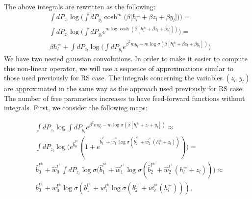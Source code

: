 The above integrals are rewritten as the following:
\begin{align}
& \int dP_{z_l} \log \bigg( \int dP_{y_{l}}  \cosh^m\bigg(\beta \big[h_l^{\pm}+\beta z_l + \beta  y_{l}\big]  \bigg)  \bigg) 
 = \\
& \int dP_{z_l} \log \biggl( \int dP_{y_{l}} e^{ m \log \cosh \left(\beta \left[h_l^{\pm}+ \beta  z_l + \beta  y_{l}\right]  \right) } \biggr) 
 = \\
& \beta h_{l}^{\pm} + \int dP_{z_l} \log \biggl( \int dP_{y_{l}} e^{\beta^2 m y_{l} - m \log \sigma \left(\beta \left[h_l^{\pm}+ \beta z_l +\beta y_{l}\right]  \right) } \biggr) 
\end{align}
We have two nested gaussian convolutions. In order to make it easier to compute this non-linear operator, we will use a sequence of approximations similar to those used previously for RS case. %
The integrals concerning the variables $(z_l, y_l)$ are approximated in the same way as the approach used previously for RS case: The number of free parameters increases to have feed-forward functions without integrals. First, we consider the following maps:
\begin{widetext}
\begin{align}
        & \int dP_{z_l}  \log \int dP_{y_{l}} e^{ \beta^2 m y_{l} - m \log \sigma \left(\beta \left[h_l^{\pm}+ z_l + y_{l}\right]  \right) }  \approx\\
        & \int dP_{z_l} \log \bigg( e^{\hat{b}_0^{l^{\pm}}}(1 + e^{\hat{b}_1^{l^{\pm}} + \hat{w}_1^{l^{\pm}} \log \sigma (\hat{b}_2^{l^{\pm}} + \hat{w}_2^{l^{\pm}} (h_l^{\pm}+ z_l)) }) \bigg) = \\
        & \hat{b}_0^{l^{\pm}} + \hat{w}_0^{l^{\pm}} \int dP_{z_l} \log \sigma \bigg(\hat{b}_1^{l^{\pm}} + \hat{w}_1^{l^{\pm}} \log \sigma (\hat{b}_2^{l^{\pm}} + \hat{w}_2^{l^{\pm}} (h_l^{\pm}+ z_l)) \bigg) \approx \\
        & b_0^{l^{\pm}} + w_0^{l^{\pm}} \log \sigma (b_1^{l^{\pm}} + w_1^{l^{\pm}} \log \sigma (b_2^{l^{\pm}} + w_2^{l^{\pm}} (h_l^{\pm}))),
\end{align}
\end{widetext}

